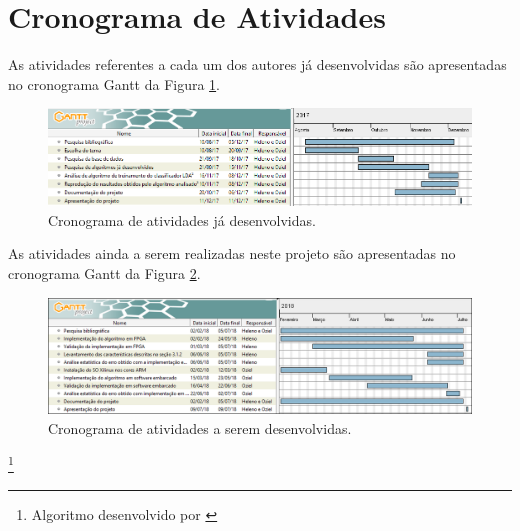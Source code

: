 \section{Cronograma de Atividades}

As atividades referentes a cada um dos autores já desenvolvidas são apresentadas no cronograma Gantt da Figura \ref{cronograma}.

\begin{figure}[h]
  \centering
  \includegraphics[keepaspectratio=true,scale=0.6]{figuras/cronograma.PNG}
  \caption{Cronograma de atividades já desenvolvidas.}
  \label{cronograma}
\end{figure}


As atividades ainda a serem realizadas neste projeto são apresentadas no cronograma Gantt da Figura \ref{cronograma2}.

\begin{figure}[h]
  \centering
  \includegraphics[keepaspectratio=true,scale=0.55]{figuras/cronograma2.PNG}
  \caption{Cronograma de atividades a serem desenvolvidas.}
  \label{cronograma2}
\end{figure}

 \footnote[1]{Algoritmo desenvolvido por \cite{F.Lotte}}
